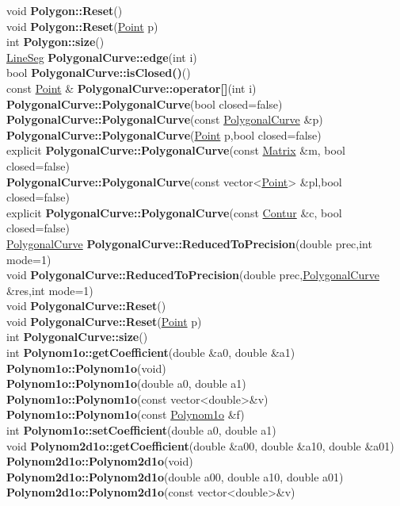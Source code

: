 \documentclass[10pt,titlepage]{article}
\def\functionlistentry#1#2#3#4#5#6{\noindent #1 {\bf #2}(#3) \dotfill #6\\}
\begin{document}
{{\functionlistentry{void}{Polygon::Reset}{}{621}{geoObject}{}
\functionlistentry{void}{Polygon::Reset}{\hyperlink{Point}{Point} p}{622}{geoObject}{}
\functionlistentry{int}{Polygon::size}{}{617}{geoObject}{}
\functionlistentry{\hyperlink{LineSeg}{LineSeg}}{PolygonalCurve::edge}{int i}{600}{geoObject}{}
\functionlistentry{bool}{PolygonalCurve::isClosed()}{}{598}{geoObject}{}
\functionlistentry{const \hyperlink{Point}{Point} \&}{PolygonalCurve::operator[]}{int i}{599}{geoObject}{}
\functionlistentry{}{PolygonalCurve::PolygonalCurve}{bool closed=false}{591}{geoObject}{}
\functionlistentry{}{PolygonalCurve::PolygonalCurve}{const \hyperlink{PolygonalCurve}{PolygonalCurve} \&p}{592}{geoObject}{}
\functionlistentry{}{PolygonalCurve::PolygonalCurve}{\hyperlink{Point}{Point} p,bool closed=false}{593}{geoObject}{}
\functionlistentry{explicit}{PolygonalCurve::PolygonalCurve}{const \hyperlink{Matrix}{Matrix} \&m, bool closed=false}{594}{geoObject}{}
\functionlistentry{}{PolygonalCurve::PolygonalCurve}{const vector<\hyperlink{Point}{Point}> \&pl,bool closed=false}{595}{geoObject}{}
\functionlistentry{explicit}{PolygonalCurve::PolygonalCurve}{const \hyperlink{Contur}{Contur} \&c, bool closed=false}{596}{geoObject}{}
\functionlistentry{\hyperlink{PolygonalCurve}{PolygonalCurve}}{PolygonalCurve::ReducedToPrecision}{double prec,int mode=1}{609}{geoObject}{}
\functionlistentry{void}{PolygonalCurve::ReducedToPrecision}{double prec,\hyperlink{PolygonalCurve}{PolygonalCurve} \&res,int mode=1}{610}{geoObject}{}
\functionlistentry{void}{PolygonalCurve::Reset}{}{602}{geoObject}{}
\functionlistentry{void}{PolygonalCurve::Reset}{\hyperlink{Point}{Point} p}{603}{geoObject}{}
\functionlistentry{int}{PolygonalCurve::size}{}{597}{geoObject}{}
\functionlistentry{int}{Polynom1o::getCoefficient}{double \&a0, double \&a1}{1008}{functions}{}
\functionlistentry{}{Polynom1o::Polynom1o}{void}{1003}{functions}{}
\functionlistentry{}{Polynom1o::Polynom1o}{double a0, double a1}{1004}{functions}{}
\functionlistentry{}{Polynom1o::Polynom1o}{const vector\textless {}double\textgreater  \&v}{1005}{functions}{}
\functionlistentry{}{Polynom1o::Polynom1o}{const \hyperlink{Polynom1o}{Polynom1o} \&f}{1006}{functions}{}
\functionlistentry{int}{Polynom1o::setCoefficient}{double a0, double a1}{1007}{functions}{}
\functionlistentry{void}{Polynom2d1o::getCoefficient}{double \&a00, double \&a10, double \&a01}{1043}{functions}{}
\functionlistentry{}{Polynom2d1o::Polynom2d1o}{void}{1038}{functions}{}
\functionlistentry{}{Polynom2d1o::Polynom2d1o}{double a00, double a10, double a01}{1039}{functions}{}
\functionlistentry{}{Polynom2d1o::Polynom2d1o}{const vector\textless {}double\textgreater  \&v}{1040}{functions}{}
}}
\end{document}
